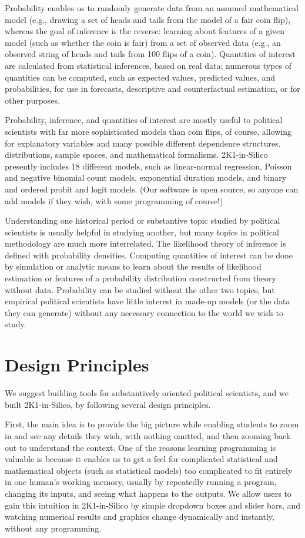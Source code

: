 \documentclass[12pt]{article}
\theoremstyle{definition}
\begin{document}
Probability enables us to randomly generate data from an assumed mathematical model (e.g., drawing a set of heads and tails from the model of a fair coin flip), whereas the goal of inference is the reverse: learning about features of a given model (such as whether the coin is fair) from a set of observed data (e.g., an observed string of heads and tails from 100 flips of a coin). Quantities of interest are calculated from statistical inferences, based on real data; numerous types of quantities can be computed, such as expected values, predicted values, and probabilities, for use in forecasts, descriptive and counterfactual estimation, or for other purposes.

Probability, inference, and quantities of interest are mostly useful to political scientists with far more sophisticated models than coin flips, of course, allowing for explanatory variables and many possible different dependence structures, distributions, sample spaces, and mathematical formalisms.  2K1-in-Silico presently includes 18 different models, such as linear-normal regression, Poisson and negative binomial count models, exponential duration models, and binary and ordered probit and logit models. (Our software is open source, so anyone can add models if they wish, with some programming of course!)

Understanding one historical period or substantive topic studied by political scientists is usually helpful in studying another, but many topics in political methodology are much more interrelated.  The likelihood theory of inference is defined with probability densities. Computing quantities of interest can be done by simulation or analytic means to learn about the results of likelihood estimation or features of a probability distribution constructed from theory without data. Probability can be studied without the other two topics, but empirical political scientists have little interest in made-up models (or the data they can generate) without any necessary connection to the world we wish to study.

\section{Design Principles}

We suggest building tools for substantively oriented political scientists, and we built 2K1-in-Silico, by following several design principles.

First, the main idea is to provide the big picture while enabling students to zoom in and see any details they wish, with nothing omitted, and then zooming back out to understand the context. One of the reasons learning programming is valuable is because it enables us to get a feel for complicated statistical and mathematical objects (such as statistical models) too complicated to fit entirely in one human's working memory, usually by repeatedly running a program, changing its inputs, and seeing what happens to the outputs. We allow users to gain this intuition in 2K1-in-Silico by simple dropdown boxes and slider bars, and watching numerical results and graphics change dynamically and instantly, without any programming.
\end{document}

